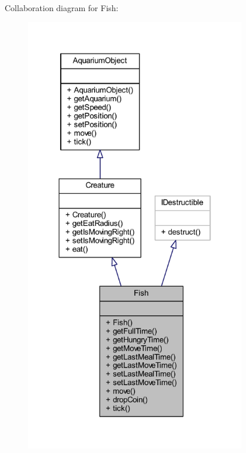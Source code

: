Collaboration diagram for Fish\+:
\nopagebreak
\begin{figure}[H]
\begin{center}
\leavevmode
\includegraphics[width=274pt]{class_fish__coll__graph}
\end{center}
\end{figure}
